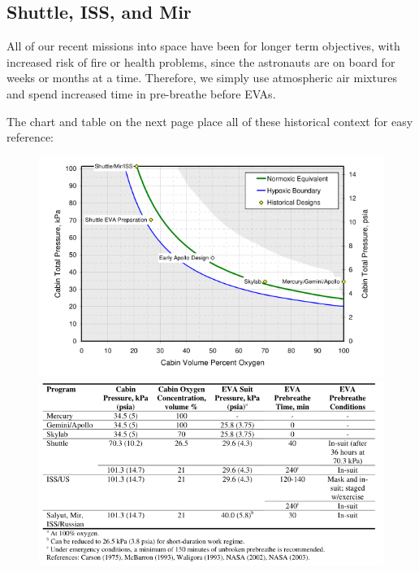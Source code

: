 \documentclass{article}
\begin{document}
  \subsection{Shuttle, ISS, and Mir}

  All of our recent missions into space have been for longer term objectives, with increased risk of fire or health problems, since the astronauts are on board for weeks or months at a time. Therefore, we simply use atmospheric air mixtures and spend increased time in pre-breathe before EVAs.

  The chart and table on the next page place all of these historical context for easy reference:

  \begin{figure}[h!]
    \begin{center}
      \includegraphics[width=0.95\linewidth]{historic_reference.png}
      \includegraphics[width=0.95\linewidth]{table.png}
    \end{center}
  \end{figure}
\end{document}
